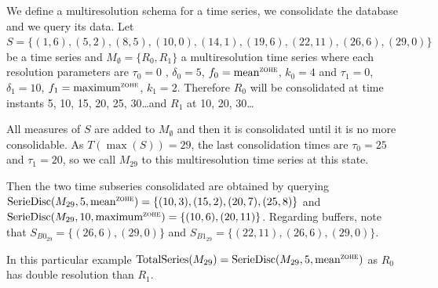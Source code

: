\begin{example}\label{ex:model:smultiresolution} 
  We define a multiresolution schema for a time series, we consolidate
  the database and we query its data.  Let $S = \{
  (1,6),(5,2),\allowbreak (8,5),\allowbreak (10,0),\allowbreak
  (14,1),\allowbreak (19,6),\allowbreak (22,11),\allowbreak
  (26,6),(29,0) \}$ be a time series and $M_\emptyset=\{R_0,R_1\}$ a
  multiresolution time series where each resolution parameters are
  $\tau_0=0$ , $\delta_0=5$, $f_0 =\meanz$, $k_0=4$ and $\tau_1=0$,
  $\delta_1=10$, $f_1 =\maxz$, $k_1=2$. Therefore $R_0$ will be
  consolidated at time instants 5, 10, 15, 20, 25, 30\dots and $R_1$
  at 10, 20, 30\dots

  All measures of $S$ are added to $M_\emptyset$
  and then it is consolidated until it is no more consolidable. As
  $T(\max(S))=29$, the last consolidation times are $\tau_0=25$ and
  $\tau_1=20$, so we call $M_{29}$ to this multiresolution time series
  at this state.

  Then the two time subseries consolidated are obtained by querying
  $\seriedisc(M_{29},5,\allowbreak \meanz)=\{(10,3),\allowbreak
  (15,\allowbreak 2),\allowbreak (20,7),\allowbreak (25,8)\}$ and
  $\seriedisc(M_{29},10,\allowbreak  \maxz) =\allowbreak \{ \allowbreak
  (10,6),\allowbreak (20,11)\}$. Regarding buffers, note that
  $S_{B0_{29}}= \{\allowbreak (26,6),\allowbreak (29,0)\allowbreak \}$
  and $S_{B1_{29}}=\{\allowbreak (22,11),\allowbreak (26,6),(29,0)\}$.

  In this particular example
  $ \totalseries(M_{29}) = \seriedisc(M_{29},\allowbreak 5,\meanz)$ as $R_0$ has
  double resolution than $R_1$. 
\end{example}





